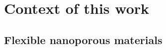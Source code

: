 \documentclass[thesis]{subfiles}
\begin{document}
\chapter{Context of this work}

\section{Flexible nanoporous materials}


%


\end{document}
